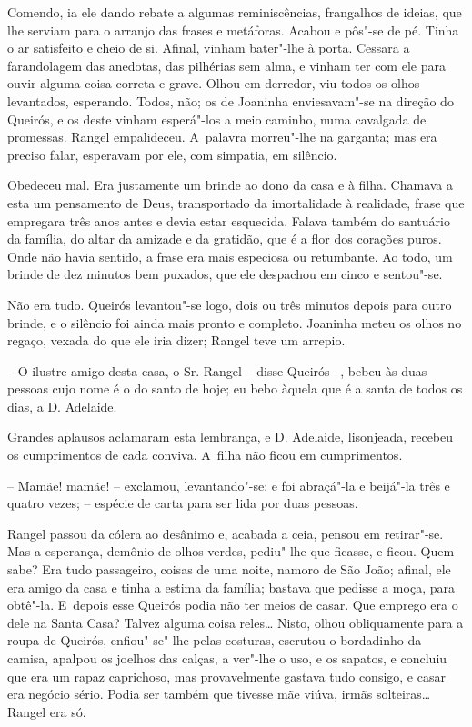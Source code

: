 Comendo, ia ele dando rebate a algumas reminiscências, frangalhos de
ideias, que lhe serviam para o arranjo das frases e metáforas. Acabou e
pôs"-se de pé. Tinha o ar satisfeito e cheio de si. Afinal, vinham
bater"-lhe à porta. Cessara a farandolagem das anedotas, das pilhérias
sem alma, e vinham ter com ele para ouvir alguma coisa correta e grave.
Olhou em derredor, viu todos os olhos levantados, esperando. Todos, não;
os de Joaninha enviesavam"-se na direção do Queirós, e os deste vinham
esperá"-los a meio caminho, numa cavalgada de promessas. Rangel
empalideceu. A~palavra morreu"-lhe na garganta; mas era preciso falar,
esperavam por ele, com simpatia, em silêncio.

Obedeceu mal. Era justamente um brinde ao dono da casa e à filha.
Chamava a esta um pensamento de Deus, transportado da imortalidade à
realidade, frase que empregara três anos antes e devia estar esquecida.
Falava também do santuário da família, do altar da amizade e da
gratidão, que é a flor dos corações puros. Onde não havia sentido, a
frase era mais especiosa ou retumbante. Ao todo, um brinde de dez
minutos bem puxados, que ele despachou em cinco e sentou"-se.

Não era tudo. Queirós levantou"-se logo, dois ou três minutos depois para
outro brinde, e o silêncio foi ainda mais pronto e completo. Joaninha
meteu os olhos no regaço, vexada do que ele iria dizer; Rangel teve um
arrepio.

-- O ilustre amigo desta casa, o Sr. Rangel -- disse Queirós --, bebeu
às duas pessoas cujo nome é o do santo de hoje; eu bebo àquela que é a
santa de todos os dias, a D. Adelaide.

Grandes aplausos aclamaram esta lembrança, e D. Adelaide, lisonjeada,
recebeu os cumprimentos de cada conviva. A~filha não ficou em
cumprimentos.

-- Mamãe! mamãe! -- exclamou, levantando"-se; e foi abraçá"-la e beijá"-la
três e quatro vezes; -- espécie de carta para ser lida por duas pessoas.

Rangel passou da cólera ao desânimo e, acabada a ceia, pensou em
retirar"-se. Mas a esperança, demônio de olhos verdes, pediu"-lhe que
ficasse, e ficou. Quem sabe? Era tudo passageiro, coisas de uma noite,
namoro de São João; afinal, ele era amigo da casa e tinha a estima da
família; bastava que pedisse a moça, para obtê"-la. E~depois esse Queirós
podia não ter meios de casar. Que emprego era o dele na Santa Casa?
Talvez alguma coisa reles\ldots{} Nisto, olhou obliquamente para a roupa de
Queirós, enfiou"-se"-lhe pelas costuras, escrutou o bordadinho da camisa,
apalpou os joelhos das calças, a ver"-lhe o uso, e os sapatos, e concluiu
que era um rapaz caprichoso, mas provavelmente gastava tudo consigo, e
casar era negócio sério. Podia ser também que tivesse mãe viúva, irmãs
solteiras\ldots{} Rangel era só.


